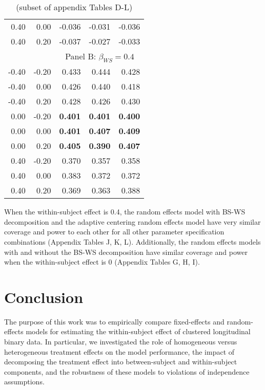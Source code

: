 \documentclass{article}
\begin{document}
\begin{table}[ht]
\begin{tabular}{|r r || r r r |}
                0.40	&0.00	&-0.036	&-0.031	&-0.036 \\
                0.40	&0.20	&-0.037	&-0.027	&-0.033 \\
                \hline
                \multicolumn{2}{|c||}{} & \multicolumn{3}{c|}{Panel B: $\beta_{WS} = 0.4$} \\
                \hline
                -0.40	&-0.20	&0.433	&0.444	&0.428 \\
                -0.40	&0.00	&0.426	&0.440	&0.418 \\
                -0.40	&0.20	&0.428	&0.426	&0.430 \\
                0.00	&-0.20	&\textbf{0.401}	&\textbf{0.401}	    &\textbf{0.400} \\
                0.00	&0.00	&\textbf{0.401}	&\textbf{0.407}	    &\textbf{0.409} \\
                0.00	&0.20	&\textbf{0.405}	&\textbf{0.390}	    &\textbf{0.407} \\
                0.40	&-0.20	&0.370	&0.357	&0.358 \\
                0.40	&0.00	&0.383	&0.372	&0.372 \\
                0.40	&0.20	&0.369	&0.363	&0.388 \\
                \hline
            \end{tabular}
        \caption*{(subset of appendix Tables D-L)}
        \end{table}
    
        When the within-subject effect is 0.4, the random effects model with BS-WS decomposition and the adaptive centering random effects model have very similar coverage and power to each other for all other parameter specification combinations (Appendix Tables J, K, L). Additionally, the random effects models with and without the BS-WS decomposition have similar coverage and power when the within-subject effect is 0 (Appendix Tables G, H, I).  
        
\section{Conclusion}

    The purpose of this work was to empirically compare fixed-effects and random-effects models for estimating the within-subject effect of clustered longitudinal binary data. In particular, we investigated the role of homogeneous versus heterogeneous treatment effects on the model performance, the impact of decomposing the treatment effect into between-subject and within-subject components, and the robustness of these models to violations of independence assumptions.
    
\end{document}
